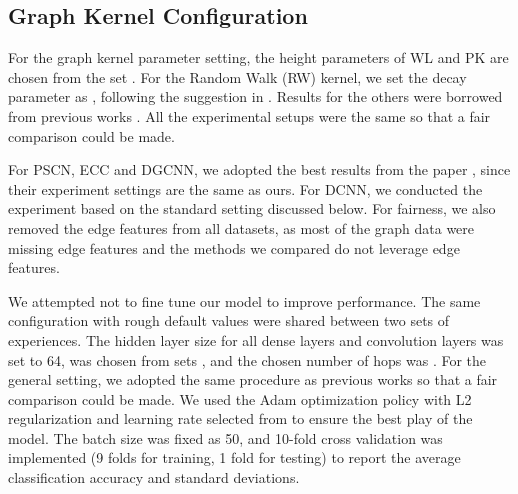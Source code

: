 \documentclass[conference]{IEEEtran}
\begin{document}
    \subsection{Graph Kernel Configuration} For the graph kernel parameter setting, the height parameters of WL and PK are chosen from the set . For the Random Walk (RW) kernel, we set the decay parameter as , following the suggestion in \cite{shervashidze2011weisfeiler}. Results for the others were borrowed from previous works \cite{niepert2016learning,yanardag2015deep,zhang2018end}. All the experimental setups were the same so that a fair comparison could be made.
    
    For PSCN, ECC and DGCNN, we adopted the best results from the paper \cite{verma2018graph}, since their experiment settings are the same as ours. For DCNN, we conducted the experiment based on the standard setting discussed below. For fairness, we also removed the edge features from all datasets, as most of the graph data were missing edge features and the methods we compared do not leverage edge features.  
    
    We attempted not to fine tune our model to improve performance. The same configuration with rough default values were shared between two sets of experiences. The hidden layer size for all dense layers and convolution layers was set to 64,  was chosen from sets , and the chosen number of hops was . For the general setting, we adopted the same procedure as previous works \cite{zhang2018end} so that a fair comparison could be made. We used the Adam \cite{kingma2014adam} optimization policy with L2 regularization and learning rate selected from  to ensure the best play of the model. The batch size was fixed as 50, and 10-fold cross validation was implemented (9 folds for training, 1 fold for testing) to report the average classification accuracy and standard deviations.
	
\end{document}
